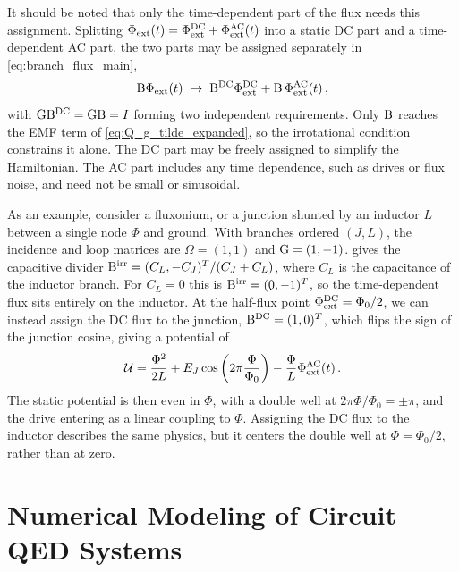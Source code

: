 It should be noted that only the time-dependent part of the flux needs this assignment.
Splitting $\Phi_{\rm ext}(t) = \Phi_{\rm ext}^{\rm DC} + \Phi_{\rm ext}^{\rm AC}(t)$ into a static DC part and a time-dependent AC part, the two parts may be assigned separately in \cref{eq:branch_flux_main},
\begin{align}
    \mathrm{B}\Phi_{\rm ext}(t) \;\rightarrow\; \mathrm{B}^{\rm DC}\Phi_{\rm ext}^{\rm DC} + \mathrm{B}\,\Phi_{\rm ext}^{\rm AC}(t) \, ,
    \label{eq:static_split_main}
\end{align}
with $\mathrm{G}\mathrm{B}^{\rm DC} = \mathrm{G}\mathrm{B} = I$ forming two independent requirements. Only $\mathrm{B}$ reaches the EMF term of \cref{eq:Q_g_tilde_expanded}, so the irrotational condition constrains it alone.
The DC part may be freely assigned to simplify the Hamiltonian.
The AC part includes any time dependence, such as drives or flux noise, and need not be small or sinusoidal.

As an example, consider a fluxonium, or a junction shunted by an inductor $L$ between a single node $\Phi$ and ground.
With branches ordered $(J,L)$, the incidence and loop matrices are $\Omega=(1,1)$ and $\mathrm{G}=(1,-1)$.
 gives the capacitive divider $\mathrm{B}^{\rm irr}=(C_L,-C_J)^T/(C_J+C_L)$, where $C_L$ is the capacitance of the inductor branch.
For $C_L=0$ this is $\mathrm{B}^{\rm irr}=(0,-1)^T$, so the time-dependent flux sits entirely on the inductor.
At the half-flux point $\Phi_{\rm ext}^{\rm DC}=\Phi_0/2$, we can instead assign the DC flux to the junction, $\mathrm{B}^{\rm DC}=(1,0)^T$, which flips the sign of the junction cosine, giving a potential of
\begin{align*}
    \mathcal U=\frac{\Phi^2}{2L}+E_J\cos\left(2\pi\frac{\Phi}{\Phi_0}\right)-\frac{\Phi}{L}\Phi_{\rm ext}^{\rm AC}(t)\,.
\end{align*}
The static potential is then even in $\Phi$, with a double well at $2\pi\Phi/\Phi_0=\pm\pi$, and the drive entering as a linear coupling to $\Phi$.
Assigning the DC flux to the inductor describes the same physics, but it centers the double well at $\Phi=\Phi_0/2$, rather than at zero.


\section{Numerical Modeling of Circuit QED Systems}\label{sec:numerical_modeling}

